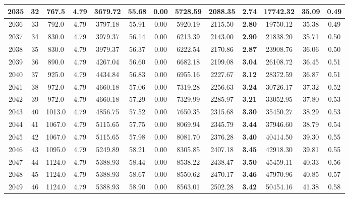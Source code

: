 {\begin{center}
\begin{tabular}[htb]{|c|c||c|c|c|c|c|c||c|c||c|c|c||}
\hline 
 2035 &  32 &  767.5 &  4.79 &  3679.72 &  55.68 &  0.00 &  5728.59 &  2088.35 &  {\bf 2.74} &  17742.32 &  35.09 &  0.49 \\ 
\hline 
 2036 &  33 &  792.0 &  4.79 &  3797.18 &  55.91 &  0.00 &  5920.19 &  2115.50 &  {\bf 2.80} &  19750.12 &  35.38 &  0.49 \\ 
\hline 
 2037 &  34 &  830.0 &  4.79 &  3979.37 &  56.14 &  0.00 &  6213.39 &  2143.00 &  {\bf 2.90} &  21838.20 &  35.71 &  0.50 \\ 
\hline 
 2038 &  35 &  830.0 &  4.79 &  3979.37 &  56.37 &  0.00 &  6222.54 &  2170.86 &  {\bf 2.87} &  23908.76 &  36.06 &  0.50 \\ 
\hline 
 2039 &  36 &  890.0 &  4.79 &  4267.04 &  56.60 &  0.00 &  6682.18 &  2199.08 &  {\bf 3.04} &  26108.72 &  36.45 &  0.51 \\ 
\hline 
 2040 &  37 &  925.0 &  4.79 &  4434.84 &  56.83 &  0.00 &  6955.16 &  2227.67 &  {\bf 3.12} &  28372.59 &  36.87 &  0.51 \\ 
\hline 
 2041 &  38 &  972.0 &  4.79 &  4660.18 &  57.06 &  0.00 &  7319.28 &  2256.63 &  {\bf 3.24} &  30726.17 &  37.32 &  0.52 \\ 
\hline 
 2042 &  39 &  972.0 &  4.79 &  4660.18 &  57.29 &  0.00 &  7329.99 &  2285.97 &  {\bf 3.21} &  33052.95 &  37.80 &  0.53 \\ 
\hline 
 2043 &  40 &  1013.0 &  4.79 &  4856.75 &  57.52 &  0.00 &  7650.35 &  2315.68 &  {\bf 3.30} &  35450.27 &  38.29 &  0.53 \\ 
\hline 
 2044 &  41 &  1067.0 &  4.79 &  5115.65 &  57.75 &  0.00 &  8069.94 &  2345.79 &  {\bf 3.44} &  37946.60 &  38.79 &  0.54 \\ 
\hline 
 2045 &  42 &  1067.0 &  4.79 &  5115.65 &  57.98 &  0.00 &  8081.70 &  2376.28 &  {\bf 3.40} &  40414.50 &  39.30 &  0.55 \\ 
\hline 
 2046 &  43 &  1095.0 &  4.79 &  5249.89 &  58.21 &  0.00 &  8305.85 &  2407.18 &  {\bf 3.45} &  42918.30 &  39.81 &  0.55 \\ 
\hline 
 2047 &  44 &  1124.0 &  4.79 &  5388.93 &  58.44 &  0.00 &  8538.22 &  2438.47 &  {\bf 3.50} &  45459.11 &  40.33 &  0.56 \\ 
\hline 
 2048 &  45 &  1124.0 &  4.79 &  5388.93 &  58.67 &  0.00 &  8550.62 &  2470.17 &  {\bf 3.46} &  47970.96 &  40.85 &  0.57 \\ 
\hline 
 2049 &  46 &  1124.0 &  4.79 &  5388.93 &  58.90 &  0.00 &  8563.01 &  2502.28 &  {\bf 3.42} &  50454.16 &  41.38 &  0.58 \\ 

\end{tabular}
\end{center}}
